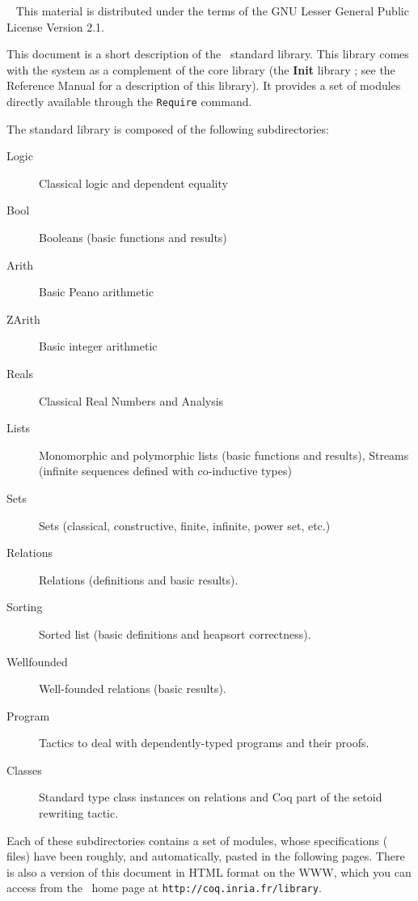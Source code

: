 \documentclass[11pt]{report}
\begin{document}
%
{\ }
{This material is distributed under the terms of the GNU Lesser
General Public License Version 2.1.}

\tableofcontents

\newpage

This document is a short description of the \Coq\ standard library.
This library comes with the system as a complement of the core library
(the {\bf Init} library ; see the Reference Manual for a description
of this library). It provides a set of modules directly available
through the \verb!Require! command.

The standard library is composed of the following subdirectories:
\begin{description}
  \item[Logic]  Classical logic and dependent equality
  \item[Bool]   Booleans (basic functions and results)
  \item[Arith]  Basic Peano arithmetic
  \item[ZArith] Basic integer arithmetic
  \item[Reals]  Classical Real Numbers and Analysis
  \item[Lists]  Monomorphic and polymorphic lists (basic functions and
                  results), Streams (infinite sequences defined
                  with co-inductive types)
  \item[Sets]   Sets (classical, constructive, finite, infinite, power set,
                  etc.)
  \item[Relations] Relations (definitions and basic results).
  \item[Sorting] Sorted list (basic definitions and heapsort
                 correctness).
  \item[Wellfounded] Well-founded relations (basic results).
  \item[Program] Tactics to deal with dependently-typed programs and
    their proofs.
  \item[Classes] Standard type class instances on relations and
    Coq part of the setoid rewriting tactic.
\end{description}


Each of these subdirectories contains a set of modules, whose
specifications (\gallina{} files) have
been roughly, and automatically, pasted in the following pages. There
is also a version of this document in HTML format on the WWW, which
you can access from the \Coq\ home page at
\texttt{http://coq.inria.fr/library}.


\end{document}
